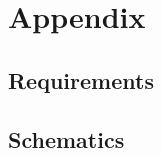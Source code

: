\section{Appendix}
\subsection{Requirements}\label{app:requirements}
\clearpage

\subsection{Schematics}
\label{app:schematic}
%
